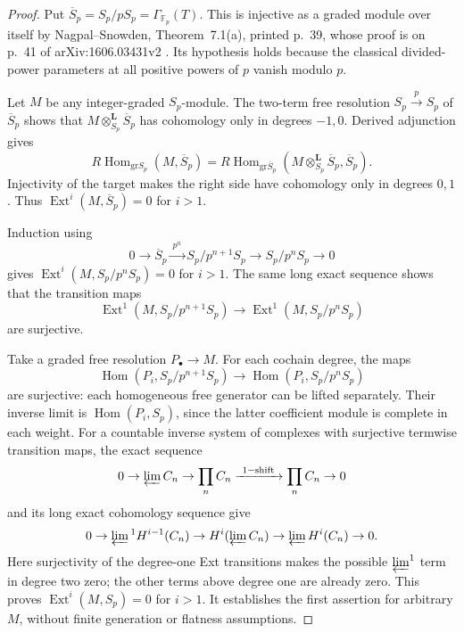 \begin{proof}
Put $\overline S_p=S_p/pS_p=\Gamma_{\mathbb F_p}(T)$.
This is injective as a graded module over itself by
Nagpal--Snowden, Theorem~7.1(a), printed p.~39, whose
proof is on p.~41 of arXiv:1606.03431v2
\cite{IC-nagpal-snowden}. Its hypothesis holds because
the classical divided-power parameters at all positive
powers of $p$ vanish modulo $p$.

Let $M$ be any integer-graded $S_p$-module. The
two-term free resolution
$S_p\xrightarrow{p}S_p$ of $\overline S_p$ shows that
$M\otimes^{\mathbf L}_{S_p}\overline S_p$ has cohomology
only in degrees $-1,0$. Derived adjunction gives
\[
 R\operatorname{Hom}_{\mathrm{gr}S_p}(M,\overline S_p)
 =R\operatorname{Hom}_{\mathrm{gr}\overline S_p}
 (M\otimes^{\mathbf L}_{S_p}\overline S_p,\overline S_p).
\]
Injectivity of the target makes the right side have
cohomology only in degrees $0,1$. Thus
$\operatorname{Ext}^i(M,\overline S_p)=0$ for $i>1$.

Induction using
\[
 0\longrightarrow\overline S_p
 \xrightarrow{\ p^n\ }S_p/p^{n+1}S_p
 \longrightarrow S_p/p^nS_p\longrightarrow0
\]
gives $\operatorname{Ext}^i(M,S_p/p^nS_p)=0$ for $i>1$.
The same long exact sequence shows that the transition
maps
\[
 \operatorname{Ext}^1(M,S_p/p^{n+1}S_p)
 \longrightarrow\operatorname{Ext}^1(M,S_p/p^nS_p)
\]
are surjective.

Take a graded free resolution $P_\bullet\to M$. For
each cochain degree, the maps
\[
\operatorname{Hom}(P_i,S_p/p^{n+1}S_p)
\to\operatorname{Hom}(P_i,S_p/p^nS_p)
\]
are surjective:
each homogeneous free generator can be lifted separately.
Their inverse limit is
$\operatorname{Hom}(P_i,S_p)$, since the latter
coefficient module is complete in each weight.
For a countable inverse system of complexes with
surjective termwise transition maps, the exact sequence
\[
 0\to\varprojlim C_n\to\prod_n C_n
 \xrightarrow{\ 1-\mathrm{shift}\ }\prod_n C_n\to0
\]
and its long exact cohomology sequence give
\[
 0\to\varprojlim{}^1 H^{i-1}(C_n)
 \to H^i(\varprojlim C_n)
 \to\varprojlim H^i(C_n)\to0.
\]
Here surjectivity of the degree-one Ext transitions
makes the possible $\varprojlim^1$ term in degree two
zero; the other terms above degree one are already zero.
This proves $\operatorname{Ext}^i(M,S_p)=0$ for $i>1$.
It establishes the first assertion for arbitrary $M$,
without finite generation or flatness assumptions.


\end{proof}
